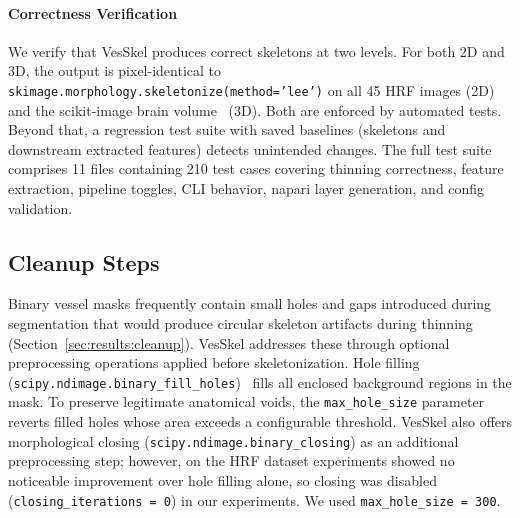 \documentclass[11pt]{article}
\begin{document}
\paragraph{Correctness Verification}\label{sec:methods:impl:tests}

We verify that VesSkel produces correct skeletons at two levels. For
both 2D and 3D, the output is pixel-identical to
\\\texttt{skimage.morphology.skeletonize(method='lee')} on all 45 HRF
images (2D) and the scikit-image brain volume~\cite{skimage} (3D).
Both are enforced by automated tests. Beyond that, a regression test
suite with saved baselines (skeletons and downstream extracted
features) detects unintended changes. The full test suite comprises
11 files containing 210 test cases covering thinning correctness,
feature extraction, pipeline toggles, CLI behavior, napari layer
generation, and config validation.

\subsection{Cleanup Steps}\label{sec:methods:cleanup}

Binary vessel masks frequently contain small holes and gaps
introduced during segmentation that would produce circular skeleton
artifacts during thinning (Section~\ref{sec:results:cleanup}).
VesSkel addresses these through optional preprocessing operations
applied before skeletonization. Hole filling
(\texttt{scipy.ndimage.binary\_fill\_holes})~\cite{scipy} fills all enclosed
background regions in the mask. To preserve legitimate anatomical
voids, the \texttt{max\_hole\_size} parameter reverts filled holes
whose area exceeds a configurable threshold. VesSkel also offers
morphological closing (\texttt{scipy.ndimage.binary\_closing}) as an
additional preprocessing step; however, on the HRF dataset
experiments showed no noticeable improvement over hole filling alone,
so closing was disabled (\texttt{closing\_iterations = 0}) in our
experiments. We used \texttt{max\_hole\_size = 300}.
\end{document}
